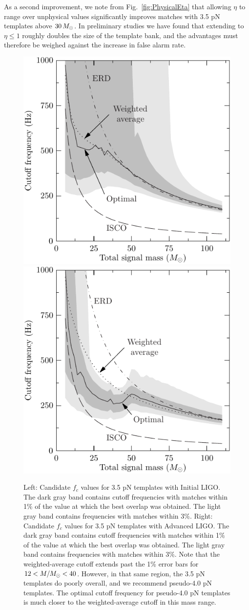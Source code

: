 As a second improvement, we note from Fig.~\ref{fig:PhysicalEta} that
allowing $\eta$ to range over unphysical values significantly improves
matches with 3.5 pN templates above $30\,M_{\odot}$. In preliminary
studies we have found that extending to $\eta \leq 1$ roughly doubles
the size of the template bank, and the advantages must therefore be
weighed against the increase in false alarm rate.

\begin{figure}
  \includegraphics[width=0.5\linewidth]{figures/comparison/FcRecommendationInitial}
  \includegraphics[width=0.5\linewidth]{figures/comparison/FcRecommendationAdvanced}
  \caption[Recommended cutoff frequencies]{
  \label{fig:FcRecomendations}
    Left: Candidate $f_c$ values for 3.5 pN templates with
    Initial LIGO.  The dark gray band contains cutoff frequencies with
    matches within 1\% of the value at which the best overlap was
    obtained.  The light gray band contains frequencies with matches
    within 3\%.  Right: Candidate $f_c$ values for 3.5 pN templates
    with Advanced LIGO.  The dark gray band contains cutoff
    frequencies with matches within 1\% of the value at which the best
    overlap was obtained.  The light gray band contains frequencies
    with matches within 3\%.  Note that the weighted-average cutoff
    extends past the 1\% error bars for $12 < M/M_{\odot} < 40$.  However,
    in that same region, the 3.5 pN templates do poorly overall, and
    we recommend pseudo-4.0 pN templates.  The optimal cutoff
    frequency for pseudo-4.0 pN templates is much closer to the
    weighted-average cutoff in this mass range.}
\end{figure}%

